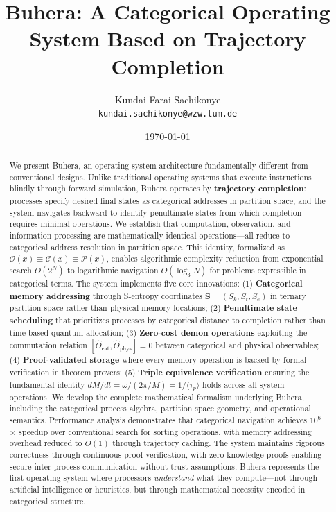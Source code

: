 \documentclass[twocolumn,10pt]{article}
\title{Buhera: A Categorical Operating System Based on Trajectory Completion}
\author{
Kundai Farai Sachikonye\\
\texttt{kundai.sachikonye@wzw.tum.de}
}
\date{\today}
\theoremstyle{definition}
\theoremstyle{remark}
\newcommand{\Scoord}{\mathbf{S}}
\begin{document}
\maketitle

\begin{abstract}
We present Buhera, an operating system architecture fundamentally different from conventional designs. Unlike traditional operating systems that execute instructions blindly through forward simulation, Buhera operates by \textbf{trajectory completion}: processes specify desired final states as categorical addresses in partition space, and the system navigates backward to identify penultimate states from which completion requires minimal operations. We establish that computation, observation, and information processing are mathematically identical operations—all reduce to categorical address resolution in partition space. This identity, formalized as $\mathcal{O}(x) \equiv \mathcal{C}(x) \equiv \mathcal{P}(x)$, enables algorithmic complexity reduction from exponential search $O(2^N)$ to logarithmic navigation $O(\log_3 N)$ for problems expressible in categorical terms. The system implements five core innovations: (1) \textbf{Categorical memory addressing} through S-entropy coordinates $\Scoord = (S_k, S_t, S_e)$ in ternary partition space rather than physical memory locations; (2) \textbf{Penultimate state scheduling} that prioritizes processes by categorical distance to completion rather than time-based quantum allocation; (3) \textbf{Zero-cost demon operations} exploiting the commutation relation $[\hat{O}_{\text{cat}}, \hat{O}_{\text{phys}}] = 0$ between categorical and physical observables; (4) \textbf{Proof-validated storage} where every memory operation is backed by formal verification in theorem provers; (5) \textbf{Triple equivalence verification} ensuring the fundamental identity $dM/dt = \omega/(2\pi/M) = 1/\langle\tau_p\rangle$ holds across all system operations. We develop the complete mathematical formalism underlying Buhera, including the categorical process algebra, partition space geometry, and operational semantics. Performance analysis demonstrates that categorical navigation achieves $10^{6}$× speedup over conventional search for sorting operations, with memory addressing overhead reduced to $O(1)$ through trajectory caching. The system maintains rigorous correctness through continuous proof verification, with zero-knowledge proofs enabling secure inter-process communication without trust assumptions. Buhera represents the first operating system where processors \emph{understand} what they compute—not through artificial intelligence or heuristics, but through mathematical necessity encoded in categorical structure.
\end{abstract}
\end{document}

